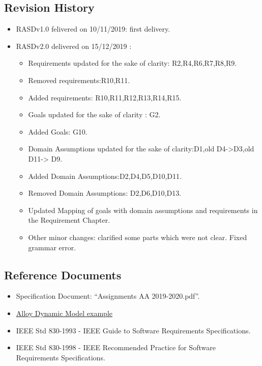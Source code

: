 \subsection {Revision History}
\begin{itemize}
\item      RASDv1.0 felivered on 10/11/2019: first delivery.
\item	 RASDv2.0 delivered on 15/12/2019 : 
	\begin{itemize}
		\item Requirements updated for the sake of clarity: R2,R4,R6,R7,R8,R9.
		\item Removed requirements:R10,R11.
		\item Added requirements: R10,R11,R12,R13,R14,R15.
		\item Goals updated for the sake of clarity : G2.
		\item Added Goals: G10.
		\item Domain Assumptions updated for the sake of clarity:D1,old D4->D3,old D11-> D9.
		\item Added Domain Assumptions:D2,D4,D5,D10,D11.
		\item Removed Domain Assumptions: D2,D6,D10,D13.
		\item Updated Mapping of goals with domain assumptions and requirements in the Requirement Chapter.
		\item Other minor changes: clarified some parts which were not clear. Fixed grammar error.
	\end{itemize}
\end{itemize}
\subsection {Reference Documents}
\begin{itemize}
\item	Specification Document: “Assignments AA 2019-2020.pdf”.
\item	\href{http://homepage.cs.uiowa.edu/~tinelli/classes/181/Spring10/Notes/09-dynamic-models.pdf }{Alloy Dynamic Model example} 
\item	IEEE Std 830-1993 - IEEE Guide to Software Requirements Specifications.
\item	IEEE Std 830-1998 - IEEE Recommended Practice for Software Requirements Specifications.

\end{itemize}
